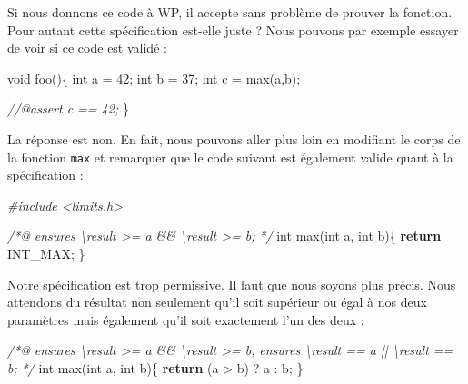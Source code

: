 \documentclass[12pt,francais,]{scrbook}
\newenvironment{Shaded}{}{}
\newcommand{\KeywordTok}[1]{\textcolor[rgb]{0.00,0.44,0.13}{\textbf{{#1}}}}
\newcommand{\DataTypeTok}[1]{\textcolor[rgb]{0.56,0.13,0.00}{{#1}}}
\newcommand{\DecValTok}[1]{\textcolor[rgb]{0.25,0.63,0.44}{{#1}}}
\newcommand{\CommentTok}[1]{\textcolor[rgb]{0.38,0.63,0.69}{\textit{{#1}}}}
\newcommand{\NormalTok}[1]{{#1}}
\begin{document}
Si nous donnons ce code à WP, il accepte sans problème de prouver la
fonction. Pour autant cette spécification est-elle juste ? Nous pouvons
par exemple essayer de voir si ce code est validé :

\begin{footnotesize}\begin{Shaded}
\begin{Highlighting}[]
\DataTypeTok{void} \NormalTok{foo()\{}
  \DataTypeTok{int} \NormalTok{a = }\DecValTok{42}\NormalTok{;}
  \DataTypeTok{int} \NormalTok{b = }\DecValTok{37}\NormalTok{;}
  \DataTypeTok{int} \NormalTok{c = max(a,b);}

  \CommentTok{//@assert c == 42;}
\NormalTok{\}}
\end{Highlighting}
\end{Shaded}\end{footnotesize}

La réponse est non. En fait, nous pouvons aller plus loin en modifiant
le corps de la fonction \texttt{max} et remarquer que le code suivant
est également valide quant à la spécification :

\begin{footnotesize}\begin{Shaded}
\begin{Highlighting}[]
\CommentTok{#include <limits.h>}

\CommentTok{/*@}
\CommentTok{  ensures \textbackslash{}result >= a && \textbackslash{}result >= b;}
\CommentTok{*/}
\DataTypeTok{int} \NormalTok{max(}\DataTypeTok{int} \NormalTok{a, }\DataTypeTok{int} \NormalTok{b)\{}
  \KeywordTok{return} \NormalTok{INT_MAX;}
\NormalTok{\}}
\end{Highlighting}
\end{Shaded}\end{footnotesize}

Notre spécification est trop permissive. Il faut que nous soyons plus
précis. Nous attendons du résultat non seulement qu'il soit supérieur ou
égal à nos deux paramètres mais également qu'il soit exactement l'un des
deux :

\begin{footnotesize}\begin{Shaded}
\begin{Highlighting}[]
\CommentTok{/*@}
\CommentTok{  ensures \textbackslash{}result >= a && \textbackslash{}result >= b;}
\CommentTok{  ensures \textbackslash{}result == a || \textbackslash{}result == b;}
\CommentTok{*/}
\DataTypeTok{int} \NormalTok{max(}\DataTypeTok{int} \NormalTok{a, }\DataTypeTok{int} \NormalTok{b)\{}
  \KeywordTok{return} \NormalTok{(a > b) ? a : b;}
\NormalTok{\}}
\end{Highlighting}
\end{Shaded}\end{footnotesize}
\end{document}
